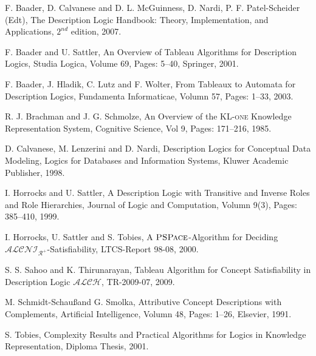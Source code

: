 \begin{thebibliography}{10}

F. Baader, D. Calvanese and D. L. McGuinness, D. Nardi, P. F. Patel-Scheider (Edt), The Description Logic Handbook: Theory, Implementation, and Applications, $2^{nd}$ edition, 2007.

F. Baader and U. Sattler, An Overview of Tableau Algorithms for Description Logics, Studia Logica, Volume 69, Pages: 5--40, Springer, 2001.

F. Baader, J. Hladik, C. Lutz and F. Wolter, From Tableaux to Automata for Description Logics, Fundamenta Informaticae, Volumn 57, Pages: 1--33, 2003.

R. J. Brachman and J. G. Schmolze, An Overview of  the  \textsc{KL-one} Knowledge  Representation System, Cognitive Science, Vol 9, Pages: 171--216, 1985.

D. Calvanese, M. Lenzerini and D. Nardi, Description Logics for Conceptual Data Modeling, Logics for Databases and Information Systems, Kluwer Academic Publisher, 1998.

I. Horrocks and U. Sattler, A Description Logic with Transitive and Inverse Roles and Role Hierarchies, Journal of Logic and Computation, Volumn 9(3), Pages: 385--410, 1999.

I. Horrocks, U. Sattler and S. Tobies, A $\textsc{PSPace}$-Algorithm for Deciding $\mathcal{ALCNI}_{\mathcal{R}^+}$-Satisfiability, LTCS-Report 98-08, 2000.

S. S. Sahoo and K. Thirunarayan, Tableau Algorithm for Concept Satisfiability in Description Logic $\mathcal{ALCH}$, TR-2009-07, 2009.

M. Schmidt-Schau\ss and G. Smolka, Attributive Concept Descriptions with Complements, Artificial Intelligence, Volumn 48, Pages: 1--26, Elsevier, 1991.

S. Tobies, Complexity Results and Practical Algorithms for Logics in Knowledge Representation, Diploma Thesis, 2001.

\end{thebibliography}
